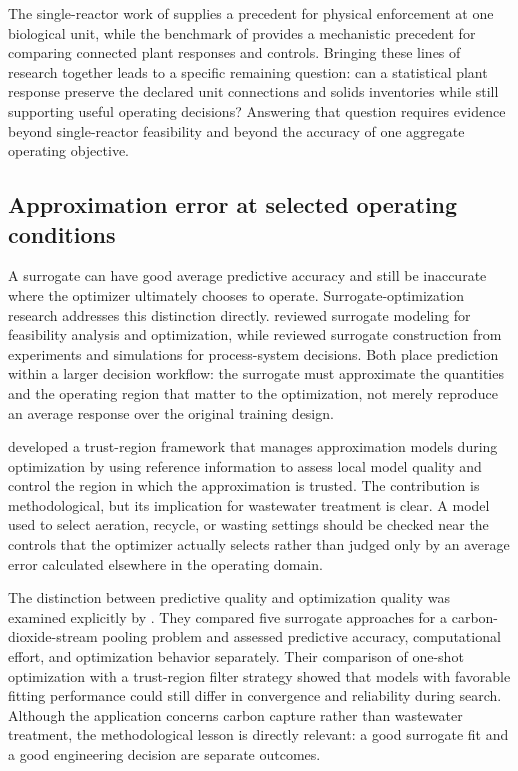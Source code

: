 The single-reactor work of \citet{Selerio2026} supplies a precedent for physical enforcement at one biological unit, while the benchmark of \citet{Alex2008} provides a mechanistic precedent for comparing connected plant responses and controls. Bringing these lines of research together leads to a specific remaining question: can a statistical plant response preserve the declared unit connections and solids inventories while still supporting useful operating decisions? Answering that question requires evidence beyond single-reactor feasibility and beyond the accuracy of one aggregate operating objective.

\subsection{Approximation error at selected operating conditions}

A surrogate can have good average predictive accuracy and still be inaccurate where the optimizer ultimately chooses to operate. Surrogate-optimization research addresses this distinction directly. \citet{BhosekarIerapetritou2018} reviewed surrogate modeling for feasibility analysis and optimization, while \citet{McBride2019} reviewed surrogate construction from experiments and simulations for process-system decisions. Both place prediction within a larger decision workflow: the surrogate must approximate the quantities and the operating region that matter to the optimization, not merely reproduce an average response over the original training design.

\citet{Alexandrov1998} developed a trust-region framework that manages approximation models during optimization by using reference information to assess local model quality and control the region in which the approximation is trusted. The contribution is methodological, but its implication for wastewater treatment is clear. A model used to select aeration, recycle, or wasting settings should be checked near the controls that the optimizer actually selects rather than judged only by an average error calculated elsewhere in the operating domain.

The distinction between predictive quality and optimization quality was examined explicitly by \citet{Pedrozo2025}. They compared five surrogate approaches for a carbon-dioxide-stream pooling problem and assessed predictive accuracy, computational effort, and optimization behavior separately. Their comparison of one-shot optimization with a trust-region filter strategy showed that models with favorable fitting performance could still differ in convergence and reliability during search. Although the application concerns carbon capture rather than wastewater treatment, the methodological lesson is directly relevant: a good surrogate fit and a good engineering decision are separate outcomes.

